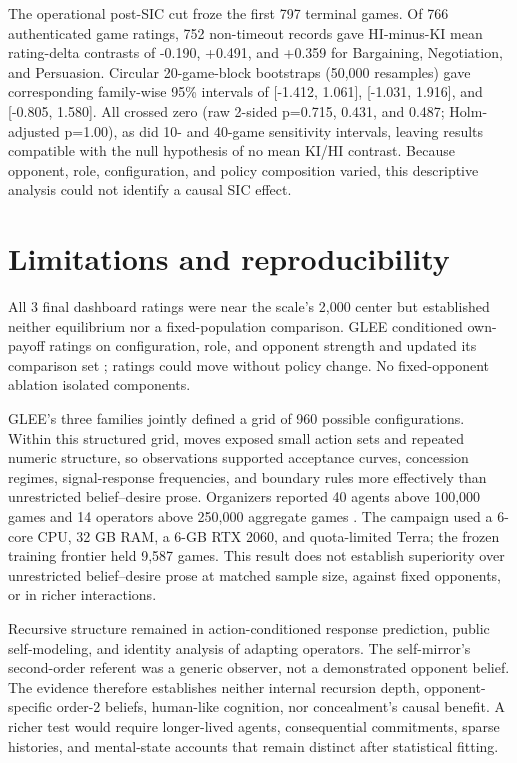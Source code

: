 \documentclass{article}
\begin{document}
The operational post-SIC cut froze the first 797 terminal games. Of 766 authenticated game ratings, 752 non-timeout records gave HI-minus-KI mean rating-delta contrasts of -0.190, +0.491, and +0.359 for Bargaining, Negotiation, and Persuasion. Circular 20-game-block bootstraps (50,000 resamples) gave corresponding family-wise 95\% intervals of [-1.412, 1.061], [-1.031, 1.916], and [-0.805, 1.580]. All crossed zero (raw 2-sided p=0.715, 0.431, and 0.487; Holm-adjusted p=1.00), as did 10- and 40-game sensitivity intervals, leaving results compatible with the null hypothesis of no mean KI/HI contrast. Because opponent, role, configuration, and policy composition varied, this descriptive analysis could not identify a causal SIC effect.

\section{Limitations and reproducibility}

All 3 final dashboard ratings were near the scale's 2,000 center but established neither equilibrium nor a fixed-population comparison. GLEE conditioned own-payoff ratings on configuration, role, and opponent strength and updated its comparison set \citep{glee2026docs}; ratings could move without policy change. No fixed-opponent ablation isolated components.

GLEE's three families jointly defined a grid of 960 possible configurations. Within this structured grid, moves exposed small action sets and repeated numeric structure, so observations supported acceptance curves, concession regimes, signal-response frequencies, and boundary rules more effectively than unrestricted belief--desire prose. Organizers reported 40 agents above 100,000 games and 14 operators above 250,000 aggregate games \citep{gleediscord2026}. The campaign used a 6-core CPU, 32 GB RAM, a 6-GB RTX 2060, and quota-limited Terra; the frozen training frontier held 9,587 games. This result does not establish superiority over unrestricted belief--desire prose at matched sample size, against fixed opponents, or in richer interactions.

Recursive structure remained in action-conditioned response prediction, public self-modeling, and identity analysis of adapting operators. The self-mirror's second-order referent was a generic observer, not a demonstrated opponent belief. The evidence therefore establishes neither internal recursion depth, opponent-specific order-2 beliefs, human-like cognition, nor concealment's causal benefit. A richer test would require longer-lived agents, consequential commitments, sparse histories, and mental-state accounts that remain distinct after statistical fitting.
\end{document}
